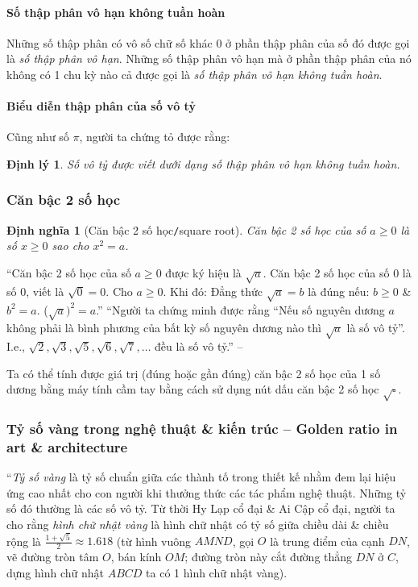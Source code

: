 \documentclass{article}
\numberwithin{equation}{section}
\newtheorem{dinhnghia}{Định nghĩa}[section]
\newtheorem{dinhly}{Định lý}[section]
\begin{document}
\paragraph{Số thập phân vô hạn không tuần hoàn}
Những số thập phân có vô số chữ số khác $0$ ở phần thập phân của số đó được gọi là \textit{số thập phân vô hạn}. Những số thập phân vô hạn mà ở phần thập phân của nó không có 1 chu kỳ nào cả được gọi là \textit{số thập phân vô hạn không tuần hoàn}.

\paragraph{Biểu diễn thập phân của số vô tỷ}
Cũng như số $\pi$, người ta chứng tỏ được rằng:

\begin{dinhly}
	Số vô tỷ được viết dưới dạng số thập phân vô hạn không tuần hoàn.
\end{dinhly}

\subsubsection{Căn bậc 2 số học}

\begin{dinhnghia}[Căn bậc 2 số học\texttt{/}square root]
	\emph{Căn bậc 2 số học} của số $a\ge 0$ là số $x\ge 0$ sao cho $x^2 = a$.
\end{dinhnghia}
``Căn bậc 2 số học của số $a\ge 0$ được ký hiệu là $\sqrt{a}$. Căn bậc 2 số học của số $0$ là số $0$, viết là $\sqrt{0} = 0$. Cho $a\ge 0$. Khi đó: Đẳng thức $\sqrt{a} = b$ là đúng nếu: $b\ge 0$ \& $b^2 = a$. ($\sqrt{a})^2 = a$.'' ``Người ta chứng minh được rằng ``Nếu số nguyên dương $a$ không phải là bình phương của bất kỳ số nguyên dương nào thì $\sqrt{a}$ là số vô tỷ''. I.e., $\sqrt{2},\sqrt{3},\sqrt{5},\sqrt{6},\sqrt{7},\ldots$ đều là số vô tỷ.'' -- \cite[p. 34]{SGK_Toan_7_Canh_Dieu_tap_1}

Ta có thể tính được giá trị (đúng hoặc gần đúng) căn bậc 2 số học của 1 số dương bằng máy tính cầm tay bằng cách sử dụng nút dấu căn bậc 2 số học $\boxed{\sqrt{\square}}$.

\subsubsection{Tỷ số vàng trong nghệ thuật \& kiến trúc -- Golden ratio in art \& architecture}
``\textit{Tỷ số vàng} là tỷ số chuẩn giữa các thành tố trong thiết kế nhằm đem lại hiệu ứng cao nhất cho con người khi thưởng thức các tác phẩm nghệ thuật. Những tỷ số đó thường là các số vô tỷ. Từ thời Hy Lạp cổ đại \& Ai Cập cổ đại, người ta cho rằng \textit{hình chữ nhật vàng} là hình chữ nhật có tỷ số giữa chiều dài \& chiều rộng là $\frac{1 + \sqrt{5}}{2}\approx 1.618$ (từ hình vuông $AMND$, gọi $O$ là trung điểm của cạnh $DN$, vẽ đường tròn tâm $O$, bán kính $OM$; đường tròn này cắt đường thẳng $DN$ ở $C$, dựng hình chữ nhật $ABCD$ ta có 1 hình chữ nhật vàng).
\end{document}
